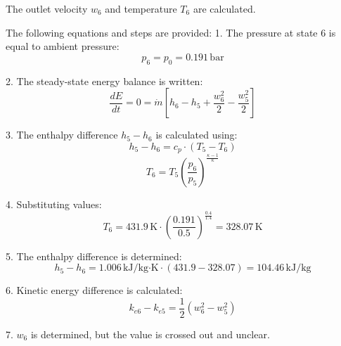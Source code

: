 The outlet velocity \( w_6 \) and temperature \( T_6 \) are calculated.  

The following equations and steps are provided:  
1. The pressure at state 6 is equal to ambient pressure:  
   \[
   p_6 = p_0 = 0.191 \, \text{bar}
   \]  

2. The steady-state energy balance is written:  
   \[
   \frac{dE}{dt} = 0 = \dot{m} \left[ h_6 - h_5 + \frac{w_6^2}{2} - \frac{w_5^2}{2} \right]
   \]  

3. The enthalpy difference \( h_5 - h_6 \) is calculated using:  
   \[
   h_5 - h_6 = c_p \cdot (T_5 - T_6)
   \]  
   \[
   T_6 = T_5 \left( \frac{p_6}{p_5} \right)^{\frac{\kappa - 1}{\kappa}}
   \]  

4. Substituting values:  
   \[
   T_6 = 431.9 \, \text{K} \cdot \left( \frac{0.191}{0.5} \right)^{\frac{0.4}{1.4}} = 328.07 \, \text{K}
   \]  

5. The enthalpy difference is determined:  
   \[
   h_5 - h_6 = 1.006 \, \text{kJ/kg·K} \cdot (431.9 - 328.07) = 104.46 \, \text{kJ/kg}
   \]  

6. Kinetic energy difference is calculated:  
   \[
   k_{e6} - k_{e5} = \frac{1}{2} \left( w_6^2 - w_5^2 \right)
   \]  

7. \( w_6 \) is determined, but the value is crossed out and unclear.
